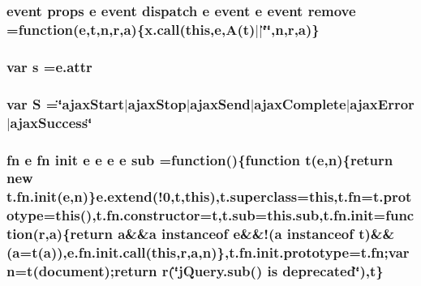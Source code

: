 \hypertarget{jquery-migrate-1_82_81_8min_8js_a4a5dfe91371a8a51afa69bcd5fddaac3}{
\subsubsection[{remove}]{ event props {\bf e} event dispatch {\bf e} event {\bf e} event remove =function({\bf e},{\bf t},{\bf n},{\bf r},{\bf a})\{{\bf x.\-call}(this,{\bf e},{\bf A}({\bf t})$\vert$$\vert$\char`\"{}\char`\"{},{\bf n},{\bf r},{\bf a})\}}}\label{jquery-migrate-1_82_81_8min_8js_a4a5dfe91371a8a51afa69bcd5fddaac3}
\hypertarget{jquery-migrate-1_82_81_8min_8js_ad9a7d92cb87932d25187fdec3ba1b621}{
\subsubsection[{s}]{\setlength{\rightskip}{0pt plus 5cm}var s ={\bf e.\-attr}}}\label{jquery-migrate-1_82_81_8min_8js_ad9a7d92cb87932d25187fdec3ba1b621}
\hypertarget{jquery-migrate-1_82_81_8min_8js_a8bab16140cede5f71c657e8dc46c1887}{
\subsubsection[{S}]{\setlength{\rightskip}{0pt plus 5cm}var S =\char`\"{}ajax\-Start$\vert$ajax\-Stop$\vert$ajax\-Send$\vert$ajax\-Complete$\vert$ajax\-Error$\vert$ajax\-Success\char`\"{}}}\label{jquery-migrate-1_82_81_8min_8js_a8bab16140cede5f71c657e8dc46c1887}
\hypertarget{jquery-migrate-1_82_81_8min_8js_abd5a235e9c4fffc368643d11d7701930}{
\subsubsection[{sub}]{ {\bf fn} {\bf e} {\bf fn} {\bf init} {\bf e} {\bf e} {\bf e} {\bf e} sub =function()\{function {\bf t}({\bf e},{\bf n})\{return new {\bf t.\-fn.\-init}({\bf e},{\bf n})\}{\bf e.\-extend}(!0,{\bf t},this),t.\-superclass=this,{\bf t.\-fn}={\bf t.\-prototype}=this(),t.\-fn.\-constructor={\bf t},t.\-sub=this.\-sub,{\bf t.\-fn.\-init}=function({\bf r},{\bf a})\{return {\bf a}\&\&{\bf a} instanceof {\bf e}\&\&!({\bf a} instanceof {\bf t})\&\&({\bf a}={\bf t}({\bf a})),{\bf e.\-fn.\-init.\-call}(this,{\bf r},{\bf a},{\bf n})\},{\bf t.\-fn.\-init.\-prototype}={\bf t.\-fn};var {\bf n}={\bf t}({\bf document});return {\bf r}(\char`\"{}j\-Query.\-sub() is deprecated\char`\"{}),t\}}}\label{jquery-migrate-1_82_81_8min_8js_abd5a235e9c4fffc368643d11d7701930}
